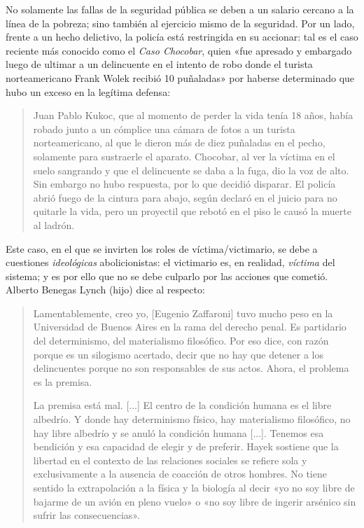 \documentclass[12pt,a4paper,twoside]{book}
\begin{document}
No solamente las fallas de la seguridad pública se deben a un salario cercano a la línea de la pobreza; sino también al ejercicio mismo de la seguridad. Por un lado, frente a un hecho delictivo, la policía está restringida en su accionar: tal es el caso reciente más conocido como el \textit{Caso Chocobar}, quien «fue apresado y embargado luego de ultimar a un delincuente en el intento de robo donde el turista norteamericano Frank Wolek recibió 10 puñaladas» \cite{panampost:chocobar} por haberse determinado que hubo un exceso en la legítima defensa:

\begin{quotation}
Juan Pablo Kukoc, que al momento de perder la vida tenía 18 años, había robado junto a un cómplice una cámara de fotos a un turista norteamericano, al que le dieron más de diez puñaladas en el pecho, solamente para sustraerle el aparato. Chocobar, al ver la víctima en el suelo sangrando y que el delincuente se daba a la fuga, dio la voz de alto. Sin embargo no hubo respuesta, por lo que decidió disparar. El policía abrió fuego de la cintura para abajo, según declaró en el juicio para no quitarle la vida, pero un proyectil que rebotó en el piso le causó la muerte al ladrón. \cite{panampost:chocobar2}
\end{quotation}

Este caso, en el que se invirten los roles de víctima/victimario, se debe a cuestiones \textit{ideológicas} abolicionistas: el victimario es, en realidad, \textit{víctima} del sistema; y es por ello que no se debe culparlo por las acciones que cometió. Alberto Benegas Lynch (hijo) dice al respecto:

\begin{quotation}
Lamentablemente, creo yo, [Eugenio Zaffaroni] tuvo mucho peso en la Universidad de Buenos Aires en la rama del derecho penal. Es partidario del determinismo, del materialismo filosófico. Por eso dice, con razón porque es un silogismo acertado, decir que no hay que detener a los delincuentes porque no son responsables de sus actos. Ahora, el problema es la premisa.

La premisa está mal. [...] El centro de la condición humana es el libre albedrío. Y donde hay determinismo físico, hay materialismo filosófico, no hay libre albedrío y se anuló la condición humana [...]. Tenemos esa bendición y esa capacidad de elegir y de preferir. Hayek sostiene que la libertad en el contexto de las relaciones sociales se refiere sola y exclusivamente a la ausencia de coacción de otros hombres. No tiene sentido la extrapolación a la física y la biología al decir «yo no soy libre de bajarme de un avión en pleno vuelo» o «no soy libre de ingerir arsénico sin sufrir las consecuencias».\cite{ablh:zaffaroni}
\end{quotation}
\end{document}
